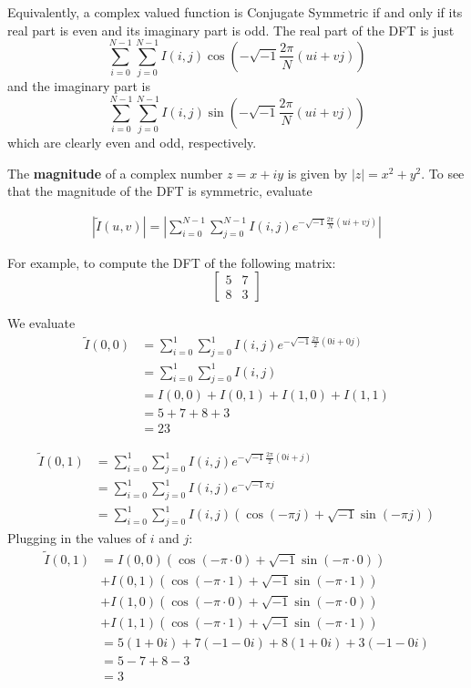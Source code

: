 \documentclass[a4paper]{article}
\begin{document}
Equivalently, a complex valued function is Conjugate Symmetric if and only if its real part is even and its imaginary part is odd. The real part of the DFT is just \[\sum_{i=0}^{N-1}\sum_{j=0}^{N-1}I(i, j)\cos{\left(-\sqrt{-1}\frac{2\pi}{N}\left(ui+vj\right)\right)}\] and the imaginary part is \[\sum_{i=0}^{N-1}\sum_{j=0}^{N-1}I(i, j)\sin{\left(-\sqrt{-1}\frac{2\pi}{N}\left(ui+vj\right)\right)}\] which are clearly even and odd, respectively.

The \textbf{magnitude} of a complex number $z=x+iy$ is given by $|z|=x^2+y^2$. To see that the magnitude of the DFT is symmetric, evaluate 

\begin{align*}
 \left|\tilde{I}(u, v)\right|=\left|\sum_{i=0}^{N-1}\sum_{j=0}^{N-1}I(i, j)e^{-\sqrt{-1}\frac{2\pi}{N}\left(ui+vj\right)}\right|
\end{align*}


For example, to compute the DFT of the following matrix: \[\begin{bmatrix}5&7\\8&3\end{bmatrix}\]

We evaluate \begin{align*}
	     \tilde{I}(0,0)&=\sum_{i=0}^1\sum_{j=0}^{1}I(i, j)e^{-\sqrt{-1}\frac{2\pi}{2}\left(0i + 0j\right)}
			 \\&=\sum_{i=0}^1\sum_{j=0}^{1}I(i,j)
			 \\&=I(0,0)+I(0,1)+I(1, 0)+I(1,1)
			 \\&=5+7+8+3
			 \\&=23
	    \end{align*}
	    
	    \begin{align*}	     
	    \tilde{I}(0,1)&=\sum_{i=0}^1\sum_{j=0}^1I(i, j)e^{-\sqrt{-1}\frac{2\pi}{2}\left(0i + j\right)}
			\\&=\sum_{i=0}^1\sum_{j=0}^1I(i,j)e^{-\sqrt{-1}\pi j}
			\\&=\sum_{i=0}^1\sum_{j=0}^1I(i,j)\left(\cos{\left(-\pi j\right)}+\sqrt{-1}\sin{\left(-\pi j\right)}\right)
	    \end{align*}
	    Plugging in the values of $i$ and $j$:
	    \begin{align*}
	    \tilde{I}(0,1)&=I(0,0)\left(\cos{\left(-\pi\cdot0\right)}+\sqrt{-1}\sin{\left(-\pi\cdot0\right)}\right)
			\\&+I(0,1)\left(\cos{\left(-\pi\cdot1\right)}+\sqrt{-1}\sin{\left(-\pi\cdot1\right)}\right)
			\\&+I(1,0)\left(\cos{\left(-\pi\cdot0\right)}+\sqrt{-1}\sin{\left(-\pi\cdot0\right)}\right)
			\\&+I(1,1)\left(\cos{\left(-\pi\cdot1\right)}+\sqrt{-1}\sin{\left(-\pi\cdot1\right)}\right)
			\\&=5\left(1+0i\right)+7\left(-1-0i\right)+8\left(1+0i\right)+3\left(-1-0i\right)
			\\&=5-7+8-3
			\\&=3
	    \end{align*}
	    
\end{document}

